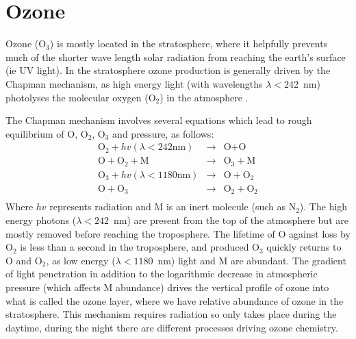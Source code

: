       

\section{Ozone}
\label{LR:O3}
  
  Ozone (O$_3$) is mostly located in the stratosphere, where it helpfully prevents much of the shorter wave length solar radiation from reaching the earth's surface (ie UV light).
  In the stratosphere ozone production is generally driven by the Chapman mechanism, as high energy light (with wavelengths $\lambda<242$~nm) photolyses the molecular oxygen (O$_2$) in the atmosphere \citep[][Chapter 3, section 2]{BrasseurJacob2017}.
  
  The Chapman mechanism involves several equations which lead to rough equilibrium of O, O$_2$, O$_3$ and pressure, as follows:
  \begin{equation}
  \begin{aligned}
  \textrm{O}_2 + hv(\lambda < 242 \text{nm}) & \rightarrow & \text{O} + \text{O} \\
  \text{O} + \text{O}_2 + \text{M} & \rightarrow & \text{O}_3 + \text{M} \\
  \text{O}_3 + hv(\lambda < 1180 \text{nm}) & \rightarrow & \text{O} + \text{O}_2 \\
  \text{O} + \text{O}_3 & \rightarrow & \text{O}_2 + \text{O}_2 \\
  \end{aligned}
  \label{LR:O3:eqn_Chapman}
  \end{equation}
  Where $hv$ represents radiation and M is an inert molecule (such as N$_2$).
  The high energy photons ($\lambda < 242$~nm) are present from the top of the atmosphere but are mostly removed before reaching the troposphere.
  The lifetime of O against loss by O$_2$ is less than a second in the troposphere, and produced O$_3$ quickly returns to O and O$_2$, as low energy ($\lambda < 1180$~nm) light and M are abundant.
  The gradient of light penetration in addition to the logarithmic decrease in atmospheric pressure (which affects M abundance) drives the vertical profile of ozone into what is called the ozone layer, where we have relative abundance of ozone in the stratosphere.
  This mechanism requires radiation so only takes place during the daytime, during the night there are different processes driving ozone chemistry.
  
